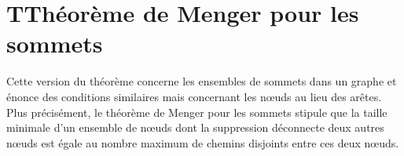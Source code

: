 \section{TThéorème de Menger pour les sommets }

Cette version du théorème concerne les ensembles de sommets dans un graphe et énonce des conditions similaires mais concernant les nœuds au lieu des arêtes. Plus précisément, le théorème de Menger pour les sommets stipule que la taille minimale d'un ensemble de nœuds dont la suppression déconnecte deux autres nœuds est égale au nombre maximum de chemins disjoints entre ces deux nœuds.
